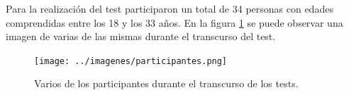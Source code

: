 \documentclass[11pt,a4paper,twoside]{book}
\begin{document}
                Para la realización del test participaron un total de 34 personas con edades comprendidas entre los 18 y los 33 años. En la figura \ref{fig:participantes} se puede observar una imagen de varias de las mismas durante el transcurso del test.
                
                \begin{figure}
                    \texttt{[image: ../imagenes/participantes.png]}
			        \centering
			        \caption{Varios de los participantes durante el transcurso de los tests.}
			        \label{fig:participantes}
                \end{figure}
            
            


\end{document}
